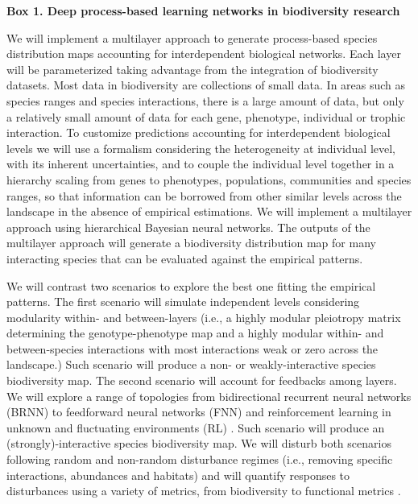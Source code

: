\documentclass[twocolumn]{article}
\begin{document}
\begin{mybox}\begin{singlespace}
{\bf{Box 1. Deep process-based learning networks in biodiversity research}}\\
\begin{small}
  We will implement a multilayer approach to generate process-based
  species distribution maps accounting for interdependent biological
  networks. Each layer will be parameterized taking advantage from the
  integration of biodiversity datasets. Most data in biodiversity are
  collections of small data. In areas such as species ranges and
  species interactions, there is a large amount of data, but only a
  relatively small amount of data for each gene, phenotype, individual
  or trophic interaction. To customize predictions accounting for
  interdependent biological levels we will use a formalism considering
  the heterogeneity at individual level, with its inherent
  uncertainties, and to couple the individual level together in a
  hierarchy scaling from genes to phenotypes, populations, communities
  and species ranges, so that information can be borrowed from other
  similar levels across the landscape in the absence of empirical
  estimations. We will implement a multilayer approach using
  hierarchical Bayesian neural networks\cite{Ghahramani:2015}. The outputs of the
  multilayer approach will generate a biodiversity distribution map
  for many interacting species that can be evaluated against the
  empirical patterns.

  We will contrast two scenarios to explore the best one fitting the
  empirical patterns. The first scenario will simulate independent
  levels considering modularity within- and between-layers (i.e., a
  highly modular pleiotropy matrix determining the genotype-phenotype
  map and a highly modular within- and between-species interactions
  with most interactions weak or zero across the landscape.) Such
  scenario will produce a non- or weakly-interactive species
  biodiversity map. The second scenario will account for feedbacks
  among layers. We will explore a range of topologies from
  bidirectional recurrent neural networks (BRNN) to feedforward neural
  networks (FNN) and reinforcement learning in unknown and fluctuating
  environments (RL) \cite{Schmidhuber:2015}. Such scenario will produce an (strongly)-interactive
  species biodiversity map. We will disturb both scenarios following
  random and non-random disturbance regimes (i.e., removing specific
  interactions, abundances and habitats) and will quantify responses
  to disturbances using a variety of metrics, from biodiversity to
  functional metrics \cite{Melian2018}.
\end{small}
\end{singlespace}
\end{mybox}
\end{document}
